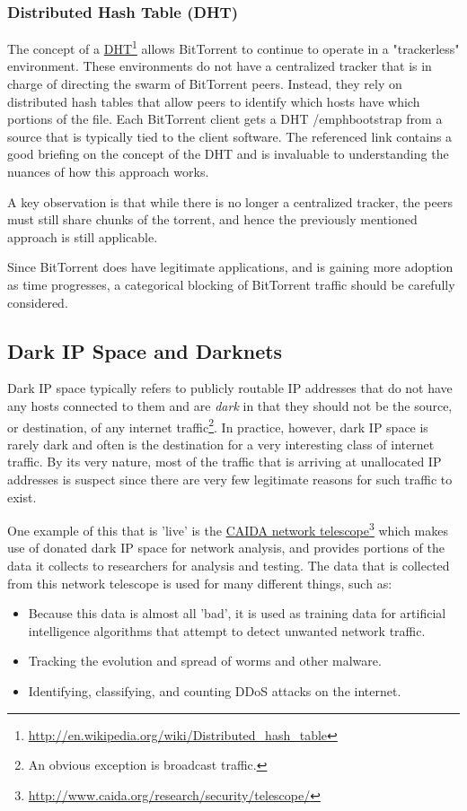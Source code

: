 \documentclass{article}
\newcommand{\hreff}[2]{\href{#1}{#2}\footnote{\url{#1}}}
\theoremstyle{remark}
\theoremstyle{definition}
\theoremstyle{definition}
\theoremstyle{definition}
\begin{document}
\subsubsection{Distributed Hash Table (DHT)}
The concept of a \hreff{http://en.wikipedia.org/wiki/Distributed_hash_table}{DHT} allows BitTorrent to continue to operate in a "trackerless" environment. These environments do not have a centralized tracker that is in charge of directing the swarm of BitTorrent peers. Instead, they rely on distributed hash tables that allow peers to identify which hosts have which portions of the file. Each BitTorrent client gets a DHT /emph{bootstrap} from a source that is typically tied to the client software. The referenced link contains a good briefing on the concept of the DHT and is invaluable to understanding the nuances of how this approach works.

A key observation is that while there is no longer a centralized tracker, the peers must still share chunks of the torrent, and hence the previously mentioned approach is still applicable.

Since BitTorrent does have legitimate applications, and is gaining more adoption as time progresses, a categorical blocking of BitTorrent traffic should be carefully considered.

\subsection{Dark IP Space and Darknets}
Dark IP space typically refers to publicly routable IP addresses that do not have any hosts connected to them and are \emph{dark} in that they should not be the source, or destination, of any internet traffic\footnote{An obvious exception is broadcast traffic.}. In practice, however, dark IP space is rarely dark and often is the destination for a very interesting class of internet traffic. By its very nature, most of the traffic that is arriving at unallocated IP addresses is suspect since there are very few legitimate reasons for such traffic to exist.

One example of this that is 'live' is the \hreff{http://www.caida.org/research/security/telescope/}{CAIDA network telescope} which makes use of donated dark IP space for network analysis, and provides portions of the data it collects to researchers for analysis and testing. The data that is collected from this network telescope is used for many different things, such as:

\begin{itemize}
\item Because this data is almost all 'bad', it is used as training data for artificial intelligence algorithms that attempt to detect unwanted network traffic.
\item Tracking the evolution and spread of worms and other malware.
\item Identifying, classifying, and counting DDoS attacks on the internet.
\end{itemize}
\end{document}
